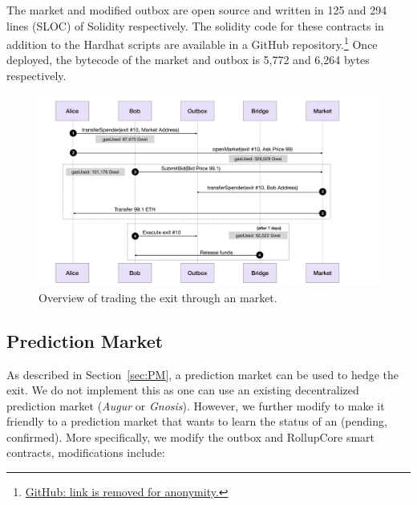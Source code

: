 The market and modified outbox are open source and written in 125 and 294 lines (SLOC) of Solidity respectively. The solidity code for these contracts in addition to the Hardhat scripts are available in a GitHub repository.\footnote{\href{https://}{GitHub: link is removed for anonymity.}} Once deployed, the bytecode of the market and outbox is 5,772 and 6,264 bytes respectively.

\begin{figure}[t]
	\includegraphics[width=1\textwidth]{figures/marketflow.pdf}
	\caption{Overview of trading the exit through an \layerone market.}
	\centering
	\label{fig:marketflow}
\end{figure}

\subsection{Prediction Market }
As described in Section~\ref{sec:PM}, a prediction market can be used to hedge the exit. We do not implement this as one can use an existing decentralized prediction market (\eg \textit{Augur} or \textit{Gnosis}). However, we further modify \arb \nitro to make it friendly to a prediction market that wants to learn the status of an \rblock (pending, confirmed). More specifically, we modify the \arb \nitro outbox and RollupCore smart contracts, modifications include:

